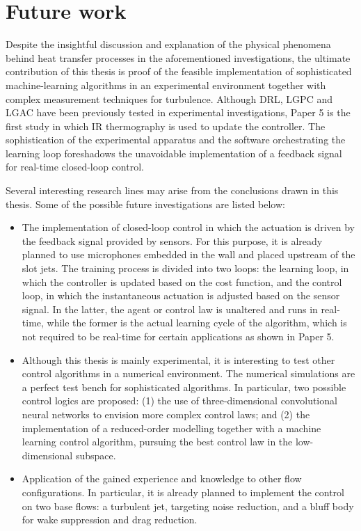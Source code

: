 \section{Future work}
Despite the insightful discussion and explanation of the physical phenomena behind heat transfer processes in the aforementioned investigations, the ultimate contribution of this thesis is proof of the feasible implementation of sophisticated machine-learning algorithms in an experimental environment together with complex measurement techniques for turbulence. Although DRL, LGPC and LGAC have been previously tested in experimental investigations, Paper 5 is the first study in which IR thermography is used to update the controller. The sophistication of the experimental apparatus and the software orchestrating the learning loop foreshadows the unavoidable implementation of a feedback signal for real-time closed-loop control.

Several interesting research lines may arise from the conclusions drawn in this thesis. Some of the possible future investigations are listed below:

\begin{itemize}
    \item The implementation of closed-loop control in which the actuation is driven by the feedback signal provided by sensors. For this purpose, it is already planned to use microphones embedded in the wall and placed upstream of the slot jets. The training process is divided into two loops: the learning loop, in which the controller is updated based on the cost function, and the control loop, in which the instantaneous actuation is adjusted based on the sensor signal. In the latter, the agent or control law is unaltered and runs in real-time, while the former is the actual learning cycle of the algorithm, which is not required to be real-time for certain applications as shown in Paper 5.
    \item Although this thesis is mainly experimental, it is interesting to test other control algorithms in a numerical environment. The numerical simulations are a perfect test bench for sophisticated algorithms. In particular, two possible control logics are proposed: (1) the use of three-dimensional convolutional neural networks to envision more complex control laws; and (2) the implementation of a reduced-order modelling together with a machine learning control algorithm, pursuing the best control law in the low-dimensional subspace.
    \item Application of the gained experience and knowledge to other flow configurations. In particular, it is already planned to implement the control on two base flows: a turbulent jet, targeting noise reduction, and a bluff body for wake suppression and drag reduction. 
\end{itemize}